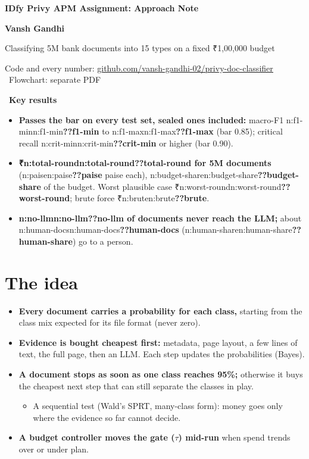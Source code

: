 \documentclass[9pt]{extarticle}
\newcommand\N[1]{\ifcsname n:#1\endcsname\csname n:#1\endcsname\else\textbf{??#1}\fi}
\newcommand\R{₹}
\begin{document}
{\fontsize{17}{20}\selectfont\bfseries IDfy Privy APM Assignment: Approach Note\par}
\vspace{2pt}
{\fontsize{11}{13}\selectfont\bfseries Vansh Gandhi\par}
\vspace{3pt}
{\fontsize{12}{14.5}\selectfont\color{ngrey} Classifying 5M bank documents into 15 types on a fixed \R1,00,000 budget\par}
\vspace{2pt}
{\color{ngrey} Code and every number: \href{https://github.com/vansh-gandhi-02/privy-doc-classifier}{\underline{github.com/vansh-gandhi-02/privy-doc-classifier}} \textbullet\ Flowchart: separate PDF\par}

\begin{callout}
\textcolor{npin}{\faThumbtack}\ \textbf{Key results}
\begin{itemize}
\item \textbf{Passes the bar on every test set, sealed ones included:} macro-F1 \N{f1-min} to \N{f1-max} (bar 0.85); critical recall \N{crit-min} or higher (bar 0.90).
\item \textbf{\R\N{total-round} for 5M documents} (\N{paise} paise each), \N{budget-share} of the budget. Worst plausible case \R\N{worst-round}; brute force \R\N{brute}.
\item \textbf{\N{no-llm} of documents never reach the LLM;} about \N{human-docs} (\N{human-share}) go to a person.
\end{itemize}
\end{callout}

\section{The idea}
\begin{itemize}
\item \textbf{Every document carries a probability for each class,} starting from the class mix expected for its file format (never zero).
\item \textbf{Evidence is bought cheapest first:} metadata, page layout, a few lines of text, the full page, then an LLM. Each step updates the probabilities (Bayes).
\item \textbf{A document stops as soon as one class reaches 95\%;} otherwise it buys the cheapest next step that can still separate the classes in play.
  \begin{itemize}
  \item A sequential test (Wald's SPRT, many-class form): money goes only where the evidence so far cannot decide.
  \end{itemize}
\item \textbf{A budget controller moves the gate ($\tau$) mid-run} when spend trends over or under plan.
\end{itemize}
\end{document}
